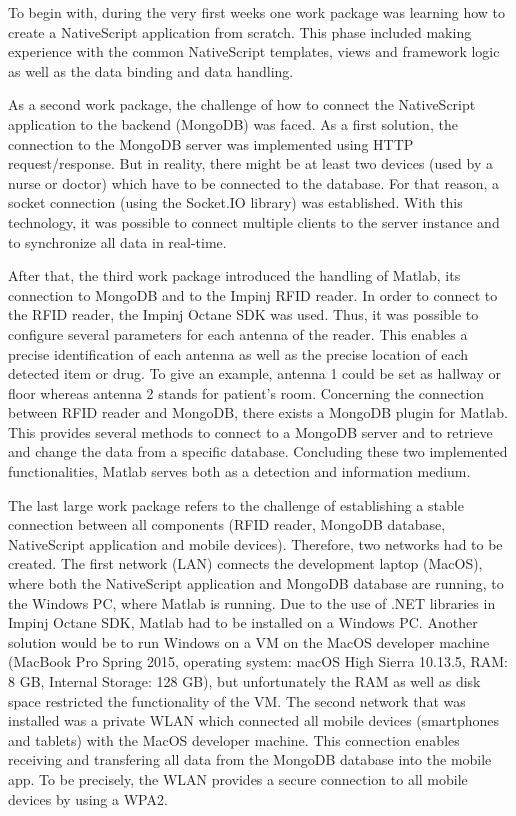 To begin with, during the very first weeks one work package was learning how to create a NativeScript application from scratch. This phase included making experience with the common NativeScript templates, views and framework logic as well as the data binding and data handling.

As a second work package, the challenge of how to connect the NativeScript application to the backend (MongoDB) was faced. As a first solution, the connection to the MongoDB server was implemented using HTTP request/response. But in reality, there might be at least two devices (used by a nurse or doctor) which have to be connected to the database. For that reason, a socket connection (using the Socket.IO library) was established. With this technology, it was possible to connect multiple clients to the server instance and to synchronize all data in real-time.

After that, the third work package introduced the handling of Matlab, its connection to MongoDB and to the Impinj RFID reader. In order to connect to the RFID reader, the Impinj Octane SDK was used. Thus, it was possible to configure several parameters for each antenna of the reader. This enables a precise identification of each antenna as well as the precise location of each detected item or drug. To give an example, antenna 1 could be set as hallway or floor whereas antenna 2 stands for patient's room. 
Concerning the connection between RFID reader and MongoDB, there exists a MongoDB plugin for Matlab. This provides several methods to connect to a MongoDB server and to retrieve and change the data from a specific database. Concluding these two implemented functionalities, Matlab serves both as a detection and information medium.

The last large work package refers to the challenge of establishing a stable connection between all components (RFID reader, MongoDB database, NativeScript application and mobile devices). Therefore, two networks had to be created. The first network (LAN) connects the development laptop (MacOS), where both the NativeScript application and MongoDB database are running, to the Windows PC, where Matlab is running. Due to the use of .NET libraries in Impinj Octane SDK, Matlab had to be installed on a Windows PC. Another solution would be to run Windows on a VM on the MacOS developer machine (MacBook Pro Spring 2015, operating system: macOS High Sierra 10.13.5, RAM: 8 GB, Internal Storage: 128 GB), but unfortunately the RAM as well as disk space restricted the functionality of the VM. The second network that was installed was a private WLAN which connected all mobile devices (smartphones and tablets) with the MacOS developer machine. This connection enables receiving and transfering all data from the MongoDB database into the mobile app. To be precisely, the WLAN provides a secure connection to all mobile devices by using a \ac{WPA2}.

